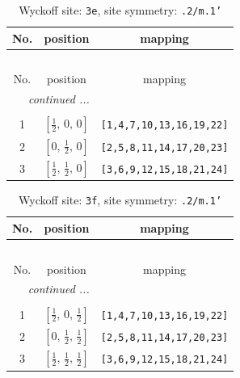 \documentclass[fleqn,8pt]{jsarticle}
\begin{document}
\begin{longtable}{ccc}
\caption{Wyckoff site: {\tt 3e}, site symmetry: {\tt .2/m.1'}}
 \\
 \hline \hline
No. & position & mapping \\ \hline \endfirsthead

\multicolumn{2}{l}{\tablename\ \thetable{}} \\
 \hline \hline
No. & position & mapping \\ \hline \endhead

 \hline \hline
\multicolumn{2}{r}{\footnotesize\it continued ...} \\ \endfoot

 \hline \hline
\multicolumn{2}{r}{} \\ \endlastfoot

1 & $\left[ \frac{1}{2},\, 0,\, 0 \right]$ & {\tt [1,4,7,10,13,16,19,22]} \\ \hline
2 & $\left[ 0,\, \frac{1}{2},\, 0 \right]$ & {\tt [2,5,8,11,14,17,20,23]} \\ \hline
3 & $\left[ \frac{1}{2},\, \frac{1}{2},\, 0 \right]$ & {\tt [3,6,9,12,15,18,21,24]} \\
\end{longtable}
\renewcommand{\arraystretch}{1.2}
\begin{longtable}{ccc}
\caption{Wyckoff site: {\tt 3f}, site symmetry: {\tt .2/m.1'}}
 \\
 \hline \hline
No. & position & mapping \\ \hline \endfirsthead

\multicolumn{2}{l}{\tablename\ \thetable{}} \\
 \hline \hline
No. & position & mapping \\ \hline \endhead

 \hline \hline
\multicolumn{2}{r}{\footnotesize\it continued ...} \\ \endfoot

 \hline \hline
\multicolumn{2}{r}{} \\ \endlastfoot

1 & $\left[ \frac{1}{2},\, 0,\, \frac{1}{2} \right]$ & {\tt [1,4,7,10,13,16,19,22]} \\ \hline
2 & $\left[ 0,\, \frac{1}{2},\, \frac{1}{2} \right]$ & {\tt [2,5,8,11,14,17,20,23]} \\ \hline
3 & $\left[ \frac{1}{2},\, \frac{1}{2},\, \frac{1}{2} \right]$ & {\tt [3,6,9,12,15,18,21,24]} \\
\end{longtable}
\renewcommand{\arraystretch}{1.2}
\end{document}
